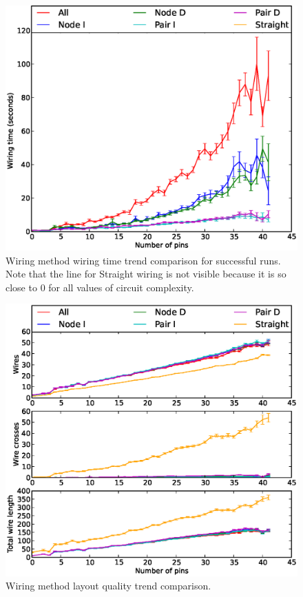 \begin{figure}[H]
\begin{center}
\includegraphics[width=\textwidth]{Images/wiring_time_trend_comparison.eps}
\caption[Wiring method wiring time trend comparison]{Wiring method wiring time
trend comparison for successful runs. Note that the line for Straight wiring is
not visible because it is so close to $0$ for all values of circuit complexity.}
\label{fig:wiring_time_trend}
\end{center}
\end{figure}

\begin{figure}[H]
\begin{center}
\includegraphics[width=\textwidth]{Images/wiring_quality_trend_comparison.eps}
\caption[Wiring method layout quality trend comparison]{Wiring method layout
quality trend comparison.}
\label{fig:wiring_quality_trend}
\end{center}
\end{figure}

